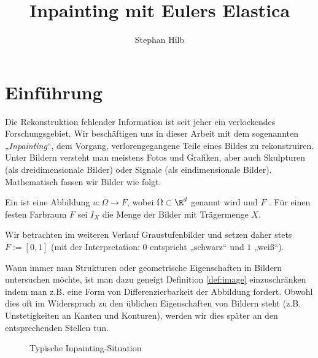 \documentclass{mythesis}
\title{Inpainting mit Eulers Elastica}
\author{Stephan Hilb}
\begin{document}


\chapter{Einführung} \label{chap:intro}

%
%


Die Rekonstruktion fehlender Information ist seit jeher ein verlockendes Forschungsgebiet.
Wir beschäftigen uns in dieser Arbeit mit dem sogenannten „\emph{Inpainting}“, dem Vorgang, verlorengegangene Teile eines Bildes zu rekonstruiren.
Unter Bildern versteht man meistens Fotos und Grafiken, aber auch Skulpturen (als dreidimensionale Bilder) oder Signale (als eindimensionale Bilder).
Mathematisch fassen wir Bilder wie folgt.

\begin{definition} \label{def:image}
    Ein  ist eine Abbildung $u: \Omega \to F$, wobei $\Omega \subset \R^d$
     genannt wird und $F$ .
    Für einen festen Farbraum $F$ sei $I_X$ die Menge der Bilder mit Trägermenge $X$.
    \begin{note}
	Wir betrachten im weiteren Verlauf Graustufenbilder und setzen daher stets $F := [0,1]$ (mit der
	Interpretation: $0$ entspricht „schwarz“ und $1$ „weiß“).
    \end{note}
\end{definition}

Wann immer man Strukturen oder geometrische Eigenschaften in Bildern untersuchen möchte, ist man dazu geneigt Definition \ref{def:image} einzuschränken indem man z.B. eine Form von Differenzierbarkeit der Abbildung fordert.
Obwohl dies oft im Widerspruch zu den üblichen Eigenschaften von Bildern steht (z.B. Unstetigkeiten an Kanten und Konturen), werden wir dies später an den entsprechenden Stellen tun.

\begin{figure}[ht]
    \centering
    \caption{Typische Inpainting-Situation}
    \label{fig:inpainting_setting}
\end{figure}
\end{document}
